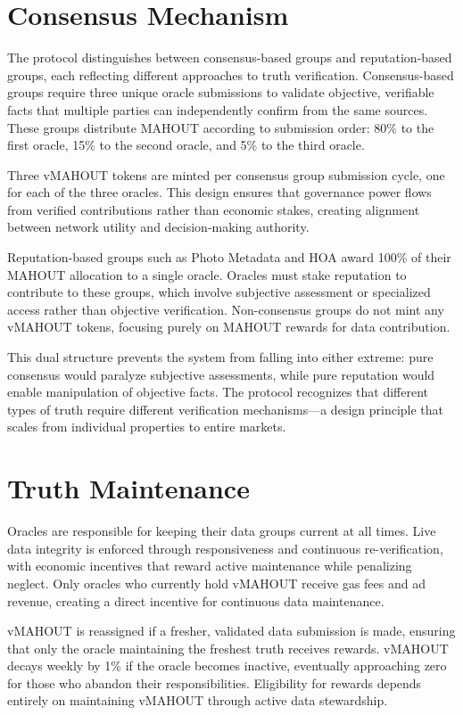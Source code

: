 \section{Consensus Mechanism}

The protocol distinguishes between consensus-based groups and reputation-based groups, each reflecting different approaches to truth verification. Consensus-based groups require three unique oracle submissions to validate objective, verifiable facts that multiple parties can independently confirm from the same sources. These groups distribute MAHOUT according to submission order: 80\% to the first oracle, 15\% to the second oracle, and 5\% to the third oracle.

Three vMAHOUT tokens are minted per consensus group submission cycle, one for each of the three oracles. This design ensures that governance power flows from verified contributions rather than economic stakes, creating alignment between network utility and decision-making authority.

Reputation-based groups such as Photo Metadata and HOA award 100\% of their MAHOUT allocation to a single oracle. Oracles must stake reputation to contribute to these groups, which involve subjective assessment or specialized access rather than objective verification. Non-consensus groups do not mint any vMAHOUT tokens, focusing purely on MAHOUT rewards for data contribution.

This dual structure prevents the system from falling into either extreme: pure consensus would paralyze subjective assessments, while pure reputation would enable manipulation of objective facts. The protocol recognizes that different types of truth require different verification mechanisms---a design principle that scales from individual properties to entire markets.

\section{Truth Maintenance}

Oracles are responsible for keeping their data groups current at all times. Live data integrity is enforced through responsiveness and continuous re-verification, with economic incentives that reward active maintenance while penalizing neglect. Only oracles who currently hold vMAHOUT receive gas fees and ad revenue, creating a direct incentive for continuous data maintenance.

vMAHOUT is reassigned if a fresher, validated data submission is made, ensuring that only the oracle maintaining the freshest truth receives rewards. vMAHOUT decays weekly by 1\% if the oracle becomes inactive, eventually approaching zero for those who abandon their responsibilities. Eligibility for rewards depends entirely on maintaining vMAHOUT through active data stewardship.

